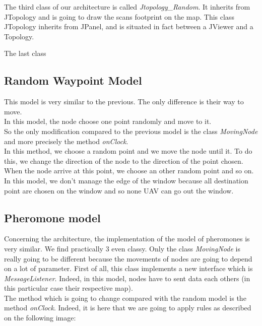 The third class of our architecture is called \textit{Jtopology\_Random}. It inherits from JTopology and is going to draw the scans footprint on the map. This class JTopology inherits from JPanel, and is situated in fact between a JViewer and a Topology.

The last class 
\subsection{Random Waypoint Model}

This model is very similar to the previous. The only difference is their way to move.\\
In this model, the node choose one point randomly and move to it.\\
So the only modification compared to the previous model is the class \textit{MovingNode} and more precisely the method \textit{onClock}.\\
In this method, we choose a random point and we move the node until it. To do this, we change the direction of the node to the direction of the point chosen. When the node arrive at this point, we choose an other random point and so on.\\
In this model, we don't manage the edge of the window because all destination point are chosen on the window and so none UAV can go out the window.

\subsection{Pheromone model}

Concerning the architecture, the implementation of the model of pheromones is very similar. We find practically 3 even classy. Only the class \textit{MovingNode} is really going to be different because the movements of nodes are going to depend on a lot of parameter. First of all, this class implements a new interface which is \textit{MessageListener}. Indeed, in this model, nodes have to sent data each others (in this particular case their respective map).\\

The method which is going to change compared with the random model is the method \textit{onClock}. Indeed, it is here that we are going to apply rules as described on the following image:

\newpage

